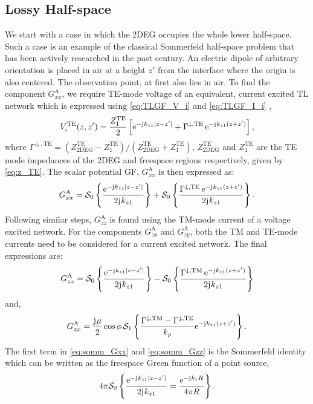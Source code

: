 \documentclass[12pt]{article}
\begin{document}
\subsection{Lossy Half-space}
%
We start with a case in which the 2DEG occupies the whole lower half-space. Such a case is an example of the classical Sommerfeld half-space problem that has been actively researched in the past century. \cite{Wait1961,Michalski1985,}  An electric dipole of arbitrary orientation is placed in air at a height $z'$ from the interface where the origin is also centered. The observation point, at first also lies in air. To find the component $G_{xx}^\mathrm{A}$, we require TE-mode voltage of an equivalent, current excited TL network which is expressed using \eqref{eq:TLGF_V_i} and \eqref{eq:TLGF_I_i} \cite[Sec. 2.4]{Felsen1994} \cite{Michalski1997},
%
\begin{equation}
  V_i^{\mathrm{TE}}(z,z') = \frac{Z_1^{\mathrm{TE}}}{2} \left [ \mathrm{e}^{-\mathrm{j}\mkern1mu k_{z1} |z - z'|} + \Gamma^{\downarrow, \mathrm{TE}} \, \mathrm{e}^{-\mathrm{j}\mkern1mu k_{z1} (z + z')} \right],
  \label{eq:Vi_halfspace}
\end{equation}
%
where $\Gamma^{\downarrow, \mathrm{TE}} = (Z_{\mathrm{2DEG}}^{\mathrm{TE}} -  Z_1^{\mathrm{TE}})/(Z_{\mathrm{2DEG}}^{\mathrm{TE}} +  Z_1^{\mathrm{TE}})$,   $Z_{\mathrm{2DEG}}^{\mathrm{TE}}$ and $Z_1^{\mathrm{TE}}$ are the TE mode impedances of the 2DEG and freespace regions respectively, given by \eqref{eq:z_TE}. The scalar potential GF, $G_{xx}^\mathrm{A}$ is then expressed as:
%
\begin{equation}
  G_{xx}^\mathrm{A} = \mathcal{S}_0 \left \{ \frac{\mathrm{e}^{-\mathrm{j}\mkern1mu k_{z1} |z - z'|}}{2 \mathrm{j}\mkern1mu k_{z1}} \right \} + \mathcal{S}_0 \left \{ \frac{\Gamma^{\downarrow, \mathrm{TE}} \, \mathrm{e}^{-\mathrm{j}\mkern1mu k_{z1} (z + z')}}{2 \mathrm{j}\mkern1mu k_{z1}} \right \}.
  \label{eq:somm_Gxx}
\end{equation}
%
Following similar steps, $G_{zz}^\mathrm{A}$ is found using the TM-mode current of a voltage excited network. For the components $G_{zx}^\mathrm{A}$ and $G_{zy}^\mathrm{A}$, both the TM and TE-mode currents need to be considered for a current excited network. The final expressions are:
%
\begin{equation}
  G_{zz}^\mathrm{A} = \mathcal{S}_0 \left \{ \frac{\mathrm{e}^{-\mathrm{j}\mkern1mu k_{z1} |z - z'|}}{2 \mathrm{j}\mkern1mu k_{z1}} \right \} - \mathcal{S}_0 \left \{ \frac{\Gamma^{\downarrow, \mathrm{TM}} \, \mathrm{e}^{-\mathrm{j}\mkern1mu k_{z1} (z + z')}}{2 \mathrm{j}\mkern1mu k_{z1}} \right \}
  \label{eq:somm_Gzz}
\end{equation}
%
and,
%
\begin{equation}
  G_{zx}^\mathrm{A} = \frac{\mathrm{j}\mkern1mu \mu}{2} \cos \phi \, \mathcal{S}_1 \left \{ \frac{\Gamma^{\downarrow, \mathrm{TM}} - \Gamma^{\downarrow, \mathrm{TE}}}{ k_{\rho}} \mathrm{e}^{-\mathrm{j}\mkern1mu k_{z1} (z + z')} \right \}.
  \label{eq:somm_Gzx}
\end{equation}
%
The first term in \eqref{eq:somm_Gxx} and \eqref{eq:somm_Gzz} is the Sommerfeld identity which can be written as the freespace Green function of a point source,
%
\begin{equation}
   4 \pi \mathcal{S}_0 \left \{ \frac{\mathrm{e}^{-\mathrm{j}\mkern1mu k_{z1} |z - z'|}}{2 \mathrm{j}\mkern1mu k_{z1}} = \frac{\mathrm{e}^{-\mathrm{j}\mkern1mu k_1 R}}{4 \pi R} \right \}.
   \label{eq:somm_id}
\end{equation}
%
\end{document}
